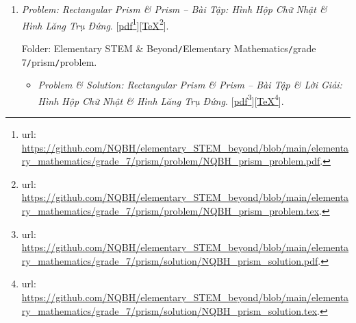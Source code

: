 \documentclass[12pt,oneside]{book}
\begin{document}
\begin{enumerate}
	Folder: {\sf Elementary STEM \& Beyond{\tt/}Elementary Mathematics{\tt/}grade 7{\tt/}real{\tt/}problem}.
	\begin{itemize}
		\item {\it Problem \& Solution: Real $\mathbb{R}$ -- Bài Tập \& Lời Giải: Số Thực $\mathbb{R}$}. [\href{https://github.com/NQBH/elementary_STEM_beyond/blob/main/elementary_mathematics/grade_7/real/problem/NQBH_real_solution.pdf}{pdf}\footnote{{\sc url}: \url{https://github.com/NQBH/elementary_STEM_beyond/blob/main/elementary_mathematics/grade_7/real/problem/NQBH_real_solution.pdf}.}][\href{https://github.com/NQBH/elementary_STEM_beyond/blob/main/elementary_mathematics/grade_7/real/problem/NQBH_real_solution.tex}{\TeX}\footnote{{\sc url}: \url{https://github.com/NQBH/elementary_STEM_beyond/blob/main/elementary_mathematics/grade_7/real/problem/NQBH_real_solution.tex}.}].
		
		Folder: {\sf Elementary STEM \& Beyond{\tt/}Elementary Mathematics{\tt/}grade 7{\tt/}real{\tt/}solution}.
	\end{itemize}
	\item {\it Problem: Rectangular Prism \& Prism -- Bài Tập: Hình Hộp Chữ Nhật \& Hình Lăng Trụ Đứng}. [\href{https://github.com/NQBH/elementary_STEM_beyond/blob/main/elementary_mathematics/grade_7/prism/problem/NQBH_prism_problem.pdf}{pdf}\footnote{{\sc url}: \url{https://github.com/NQBH/elementary_STEM_beyond/blob/main/elementary_mathematics/grade_7/prism/problem/NQBH_prism_problem.pdf}.}][\href{https://github.com/NQBH/elementary_STEM_beyond/blob/main/elementary_mathematics/grade_7/prism/problem/NQBH_prism_problem.tex}{\TeX}\footnote{{\sc url}: \url{https://github.com/NQBH/elementary_STEM_beyond/blob/main/elementary_mathematics/grade_7/prism/problem/NQBH_prism_problem.tex}.}].
	
	Folder: {\sf Elementary STEM \& Beyond{\tt/}Elementary Mathematics{\tt/}grade 7{\tt/}prism{\tt/}problem}.
	\begin{itemize}
		\item {\it Problem \& Solution: Rectangular Prism \& Prism -- Bài Tập \& Lời Giải: Hình Hộp Chữ Nhật \& Hình Lăng Trụ Đứng}. [\href{https://github.com/NQBH/elementary_STEM_beyond/blob/main/elementary_mathematics/grade_7/prism/solution/NQBH_prism_solution.pdf}{pdf}\footnote{{\sc url}: \url{https://github.com/NQBH/elementary_STEM_beyond/blob/main/elementary_mathematics/grade_7/prism/solution/NQBH_prism_solution.pdf}.}][\href{https://github.com/NQBH/elementary_STEM_beyond/blob/main/elementary_mathematics/grade_7/prism/solution/NQBH_prism_solution.tex}{\TeX}\footnote{{\sc url}: \url{https://github.com/NQBH/elementary_STEM_beyond/blob/main/elementary_mathematics/grade_7/prism/solution/NQBH_prism_solution.tex}.}].
		

\end{itemize}
\end{enumerate}
\end{document}
